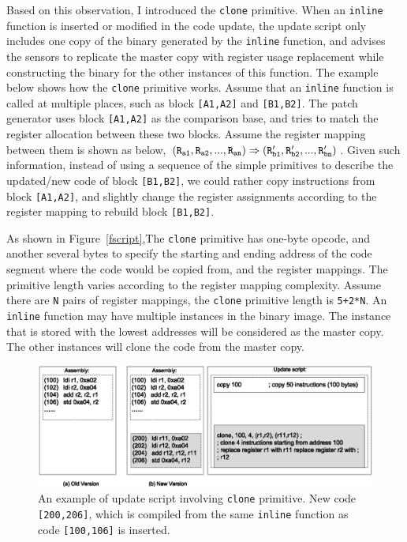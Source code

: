Based on this observation, I introduced the {\tt clone} primitive. 
When an {\tt inline} function is inserted or modified in the code update, the update script only includes one copy of the binary generated by the {\tt inline} function, and advises the sensors to 
replicate the master copy with register usage replacement while constructing the binary for the other instances of this function.
The example below shows how the {\tt clone} primitive works.
Assume that an {\tt inline}
function is called at multiple places, such as block {\tt [A1,A2]} and {\tt [B1,B2]}. 
The patch generator uses block {\tt [A1,A2]} as the comparison base, 
and tries to match the register allocation between these two blocks. 
Assume the register mapping between them is shown as below, 
$(\tt{R_{a1},R_{a2},...,R_{an})\Rightarrow(R_{b1}^\prime,R_{b2}^\prime,...,R_{bn}^\prime)}$.
Given such information, instead of using a sequence of the simple primitives to describe the
updated/new code of block {\tt [B1,B2]}, we could rather copy instructions from block 
{\tt [A1,A2]}, and slightly change the register
assignments according to the register mapping 
to rebuild block {\tt [B1,B2]}.

As shown in Figure~\ref{fscript},The {\tt clone} primitive has one-byte opcode, and another
several bytes to specify the starting and ending address 
of the code segment where the code would be copied from, and the register mappings.
The primitive length varies according to the register mapping complexity.
Assume there are {\tt N} pairs of register mappings, the {\tt clone} primitive length is
{\tt 5+2*N}. An {\tt inline} function may have multiple instances in the binary image. The 
instance that is stored with the lowest addresses will be considered as the master copy.
The other instances will clone the code from the master copy.


\begin{figure}[htbp]
\centering
\includegraphics[width=6in]{figures/sclone.eps}
\caption{An example of update script involving {\tt clone} primitive. New code {\tt [200,206]}, which
is compiled from the same {\tt inline} function as code {\tt [100,106]} is inserted.}
\label{fclone}
\end{figure}


